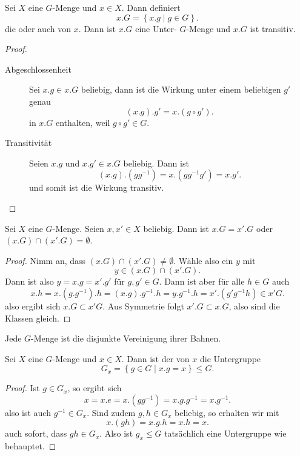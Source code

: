 \begin{lemmadef}[Bahn]\label{def:bahn-orbit}
    Sei $X$ eine  $G$-Menge und  $x\in X$. Dann definiert
    \[
    x.G = \left \{x.g \mid  g\in G\right\} 
    .\] 
    die  oder auch  von $x$. Dann ist  $x.G$ eine Unter- $G$-Menge und  $x.G$ ist transitiv.
\end{lemmadef}
\begin{proof}
    \begin{description}
        \item[Abgeschlossenheit] Sei $x.g \in x.G$ beliebig, dann ist die Wirkung unter einem beliebigen $g'$ genau
            \[
                (x.g).g' = x.(g \circ g')
            .\] 
            in $x.G$ enthalten, weil  $g \circ  g'\in G$.
        \item[Transitivität] Seien $x.g$ und  $x.g'\in x.G$ beliebig. Dann ist
            \[
                (x.g).(gg^{-1}) = x.(gg^{-1}g') = x.g'
            .\] 
            und somit ist die Wirkung transitiv.
    \end{description}
\end{proof}

\begin{lemma}
Sei $X$ eine  $G$-Menge. Seien $x,x' \in X$ beliebig. Dann ist $x.G = x'.G$ oder  $(x.G) \cap  (x'.G) = \emptyset$.
\end{lemma}

\begin{proof}
    Nimm an, dass $(x.G) \cap  (x'.G) \neq  \emptyset$. Wähle also ein $y$ mit 
     \[
         y\in  (x.G) \cap  (x'.G)
    .\] 
    Dann ist also $y = x.g = x'.g'$ für  $g,g' \in G$. Dann ist aber für alle $h\in G$ auch
    \[
        x.h = x.(g.g^{-1}).h = (x.g).g^{-1}.h = y.g^{-1}.h = x'.(g'g^{-1}h) \in x'G
    .\] 
    also ergibt sich $x.G \subset x'G$. Aus Symmetrie folgt $x'.G \subset x.G$, also sind die Klassen gleich.
\end{proof}

\begin{dcorollary}\label{cor:g-menge-ist-disjunkte-vereinigung-der-bahnen}
    Jede $G$-Menge ist die disjunkte Vereinigung ihrer Bahnen.
\end{dcorollary}

\begin{dlemmadef}[Stabilisator]\label{def:stabilisator}
    Sei $X$ eine  $G$-Menge und  $x\in X$. Dann ist der  von $x$ die Untergruppe
    \[
    G_x = \left \{g\in G \mid  x.g = x\right\}\leq  G
    .\] 
\end{dlemmadef}
\begin{proof}
    Ist $g\in G_x$, so ergibt sich
    \[
        x = x.e = x.(gg^{-1}) = x.g.g^{-1} = x.g^{-1}
    .\] 
    also ist auch $g^{-1}\in G_x$. Sind zudem $g,h\in G_x$ beliebig, so erhalten wir mit
    \[
        x.(gh) = x.g.h = x.h = x
    .\] 
    auch sofort, dass $gh \in G_x$. Also ist $g_x \leq  G$ tatsächlich eine Untergruppe wie behauptet.
\end{proof}

